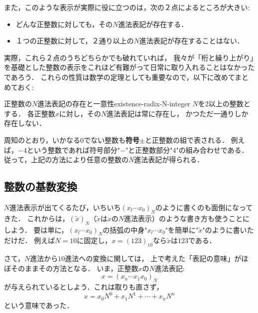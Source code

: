\documentclass[a5j, uplatex, dvipdfmx]{jsbook}
\makeatletter
\newcommand{\ind}[2]{\textbf{#1}\index{#2@#1}}
\makeatother
\begin{document}
    また，このような表示が実際に役に立つのは，次の２点によるところが大きい:

    \begin{itemize}
        \item どんな正整数に対しても，その$N$進法表記が存在する．
        \item １つの正整数に対して，２通り以上の$N$進法表記が存在することはない．
    \end{itemize}

    実際，これら２点のうちどちらかでも破れていれば，
    我々が「桁と繰り上がり」を基礎とした整数の表示をこれほど有難がって日常に取り入れることはなかったであろう．
    これらの性質は数学の定理としても重要なので，以下に改めてまとめておく:

    \begin{thm}{正整数の$N$進法表記の存在と一意性}{existence-radix-N-integer}
        $N$を$2$以上の整数とする．
        各正整数$x$に対し，その$N$進法表記は常に存在し，
        かつただ一通りしか存在しない．
    \end{thm}

    周知のとおり，いかなる$0$でない整数も\ind{符号}{ふごう}$\pm$と正整数の組で表される．
    例えば，$-4$という整数であれば符号部分"$-$"と正整数部分"$4$"の組み合わせである．
    従って，上記の方法により任意の整数の$N$進法表記が得られる．

\subsection{整数の基数変換}
    $N$進法表示が出てくるたび，いちいち$(x_l \cdots x_0)_N$のように書くのも面倒になってきた．
    これからは，$(\tilde{x})_N$（$\tilde{x}$は$x$の$N$進法表示）のような書き方も使うことにしよう．
    要は単に，$(x_l \cdots x_0)_N$の括弧の中身"$x_l \cdots x_0$"を簡単に"$\tilde{x}$"のように書いただけだ．
    例えば$N=10$に固定し，$x = (123)_{10}$なら$\tilde{x}$は$123$である．

    さて，$N$進法から$10$進法への変換に関しては，
    上で考えた「表記の意味」がほぼそのままその方法となる．
    いま，正整数$x$の$N$進法表記:
    \begin{equation*}
        x = (x_n \cdots x_1 x_0)_N
    \end{equation*}
    が与えられているとしよう．これは取りも直さず，
    \begin{equation*}
        x = x_0 N^0 + x_1 N^1 + \cdots + x_n N^n
    \end{equation*}
    という意味であった．
    
\end{document}
